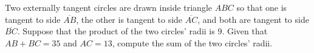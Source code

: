 Two externally tangent circles are drawn inside triangle $ABC$ so that one is tangent to side $\overline{AB}$, the other is tangent to side $\overline{AC}$, and both are tangent to side $\overline{BC}$. Suppose that the product of the two circles' radii is $9$. Given that $AB+BC=35$ and $AC=13$, compute the sum of the two circles' radii.
